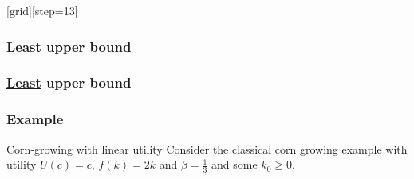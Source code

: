 \documentclass[aspectratio=169]{beamer}
\begin{document}
{
[grid][step=13]

\begin{frame}
\frametitle{Least \underline{upper bound}}
\end{frame}

\begin{frame}
\frametitle{\underline{Least} upper bound}
\end{frame}

\begin{frame}[t]
\frametitle{Example}
\begin{block}{Corn-growing with linear utility}
Consider the classical corn growing example with utility $U(c)=c$, $f(k)=2 k$ and $\beta= \frac{1}{3}$ and some $k_0 \geq 0$.
\end{block}
\end{frame}

}
\end{document}
